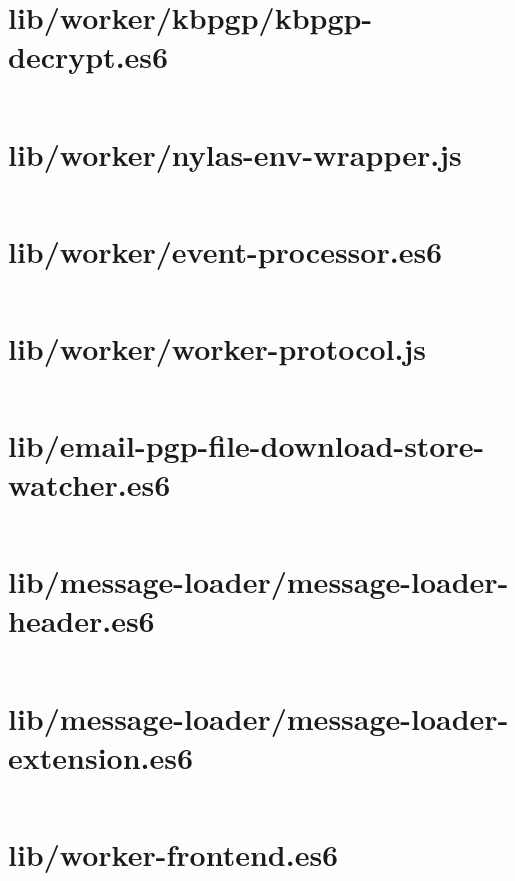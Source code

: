 \documentclass[10pt, letterpaper]{article}
\begin{document}
\section{lib/worker/kbpgp/kbpgp-decrypt.es6}
\inputminted{javascript}{/home/mbilker/.nylas/dev/packages/email-pgp/lib/worker/kbpgp/kbpgp-decrypt.es6}

\section{lib/worker/nylas-env-wrapper.js}
\inputminted{javascript}{/home/mbilker/.nylas/dev/packages/email-pgp/lib/worker/nylas-env-wrapper.js}

\section{lib/worker/event-processor.es6}
\inputminted{javascript}{/home/mbilker/.nylas/dev/packages/email-pgp/lib/worker/event-processor.es6}

\section{lib/worker/worker-protocol.js}
\inputminted{javascript}{/home/mbilker/.nylas/dev/packages/email-pgp/lib/worker/worker-protocol.js}

\section{lib/email-pgp-file-download-store-watcher.es6}
\inputminted{javascript}{/home/mbilker/.nylas/dev/packages/email-pgp/lib/email-pgp-file-download-store-watcher.es6}

\section{lib/message-loader/message-loader-header.es6}
\inputminted{javascript}{/home/mbilker/.nylas/dev/packages/email-pgp/lib/message-loader/message-loader-header.es6}

\section{lib/message-loader/message-loader-extension.es6}
\inputminted{javascript}{/home/mbilker/.nylas/dev/packages/email-pgp/lib/message-loader/message-loader-extension.es6}

\section{lib/worker-frontend.es6}
\inputminted{javascript}{/home/mbilker/.nylas/dev/packages/email-pgp/lib/worker-frontend.es6}
\end{document}
